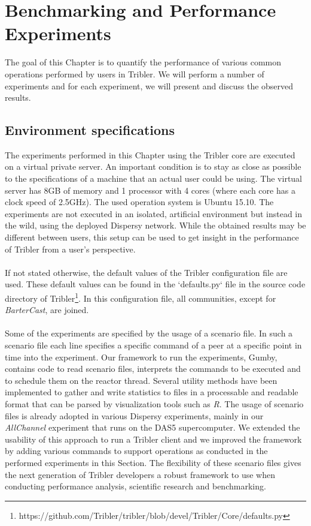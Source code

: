 \chapter{Benchmarking and Performance Experiments}
\label{chapter:experiments}

The goal of this Chapter is to quantify the performance of various common operations performed by users in Tribler. We will perform a number of experiments and for each experiment, we will present and discuss the observed results.

\section{Environment specifications}
The experiments performed in this Chapter using the Tribler core are executed on a virtual private server. An important condition is to stay as close as possible to the specifications of a machine that an actual user could be using. The virtual server has 8GB of memory and 1 processor with 4 cores (where each core has a clock speed of 2.5GHz). The used operation system is Ubuntu 15.10. The experiments are not executed in an isolated, artificial environment but instead in the wild, using the deployed Dispersy network. While the obtained results may be different between users, this setup can be used to get insight in the performance of Tribler from a user's perspective.\\\\
If not stated otherwise, the default values of the Tribler configuration file are used. These default values can be found in the `defaults.py` file in the source code directory of Tribler\footnote{https://github.com/Tribler/tribler/blob/devel/Tribler/Core/defaults.py}. In this configuration file, all communities, except for \emph{BarterCast}, are joined.\\\\
Some of the experiments are specified by the usage of a scenario file. In such a scenario file each line specifies a specific command of a peer at a specific point in time into the experiment. Our framework to run the experiments, Gumby, contains code to read scenario files, interprets the commands to be executed and to schedule them on the reactor thread. Several utility methods have been implemented to gather and write statistics to files in a processable and readable format that can be parsed by visualization tools such as \emph{R}. The usage of scenario files is already adopted in various Dispersy experiments, mainly in our \emph{AllChannel} experiment that runs on the DAS5 supercomputer. We extended the usability of this approach to run a Tribler client and we improved the framework by adding various commands to support operations as conducted in the performed experiments in this Section. The flexibility of these scenario files gives the next generation of Tribler developers a robust framework to use when conducting performance analysis, scientific research and benchmarking.

